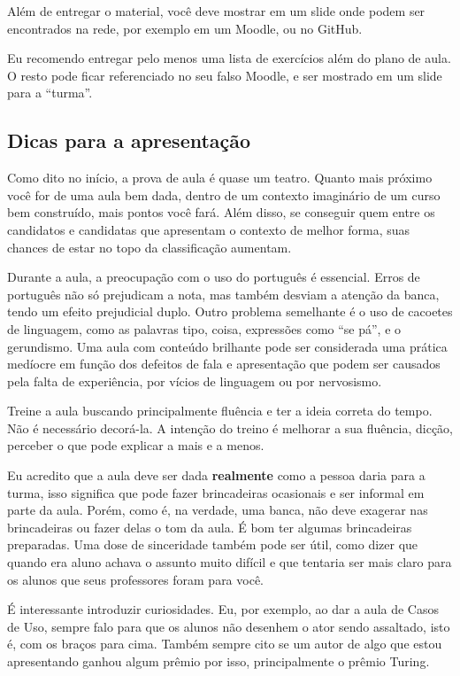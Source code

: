 \documentclass{article}
\begin{document}
Além de entregar o material, você deve mostrar em um slide onde podem ser encontrados na rede, por exemplo em um Moodle, ou no GitHub.

Eu recomendo entregar pelo menos uma lista de exercícios além do plano de aula. O resto pode ficar referenciado no seu falso Moodle, e ser mostrado em um slide para a ``turma''.




\subsection{Dicas para a apresentação}

Como dito no início, a prova de aula é quase um teatro. Quanto mais próximo você for de uma aula bem dada, dentro de um contexto imaginário de um curso bem construído, mais pontos você fará. Além disso, se conseguir quem entre os candidatos e candidatas que apresentam o contexto de melhor forma, suas chances de estar no topo da classificação aumentam.

Durante a aula, a preocupação com o uso do português é essencial. Erros de português não só prejudicam a nota, mas também desviam a atenção da banca, tendo um efeito prejudicial duplo. Outro problema semelhante é o uso de cacoetes de linguagem, como as palavras tipo, coisa, expressões como ``se pá'', e o gerundismo. Uma aula com conteúdo brilhante pode ser considerada  uma prática medíocre em função dos defeitos de fala e apresentação que podem ser causados pela falta de experiência, por vícios de linguagem ou por nervosismo.

Treine a aula buscando principalmente fluência e ter a ideia correta do tempo. Não é necessário decorá-la. A intenção do treino é melhorar a sua fluência, dicção, perceber o que pode explicar a mais e a menos.

Eu acredito que a aula deve ser dada \textbf{realmente} como a pessoa daria para a turma, isso significa que pode fazer brincadeiras ocasionais e ser informal em parte da aula. Porém, como é, na verdade, uma banca, não deve exagerar nas brincadeiras ou fazer delas o tom da aula. É bom ter algumas brincadeiras preparadas. Uma dose de sinceridade também pode ser útil, como dizer que quando era aluno achava o assunto muito difícil e que tentaria ser mais claro para os alunos que seus professores foram para você.

É interessante introduzir curiosidades. Eu, por exemplo, ao dar a aula de Casos de Uso, sempre falo para que os alunos não desenhem o ator sendo assaltado, isto é, com os braços para cima. Também sempre cito se um autor de algo que estou apresentando ganhou algum prêmio por isso, principalmente o prêmio Turing.
\end{document}
